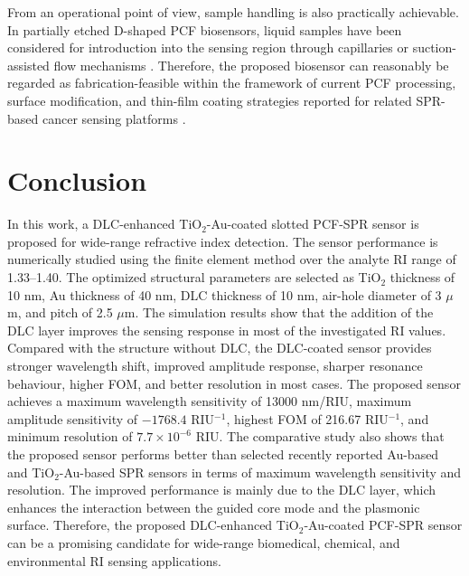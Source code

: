 \documentclass[preprint,12pt]{elsarticle}
\begin{document}
From an operational point of view, sample handling is also practically achievable. In partially etched D-shaped PCF biosensors, liquid samples have been considered for introduction into the sensing region through capillaries or suction-assisted flow mechanisms \cite{singh2023bottom}. Therefore, the proposed biosensor can reasonably be regarded as fabrication-feasible within the framework of current PCF processing, surface modification, and thin-film coating strategies reported for related SPR-based cancer sensing platforms \cite{ashrafian2025highly,bhuyan2025black,singh2023bottom,erdogan2025diamond,rafi2025cancer}.

\section{\textbf{{Conclusion}}}

In this work, a DLC-enhanced TiO$_2$-Au-coated slotted PCF-SPR sensor is proposed for wide-range refractive index detection. The sensor performance is numerically studied using the finite element method over the analyte RI range of 1.33--1.40. The optimized structural parameters are selected as TiO$_2$ thickness of 10 nm, Au thickness of 40 nm, DLC thickness of 10 nm, air-hole diameter of 3 $\mu$m, and pitch of 2.5 $\mu$m. The simulation results show that the addition of the DLC layer improves the sensing response in most of the investigated RI values. Compared with the structure without DLC, the DLC-coated sensor provides stronger wavelength shift, improved amplitude response, sharper resonance behaviour, higher FOM, and better resolution in most cases. The proposed sensor achieves a maximum wavelength sensitivity of 13000 nm/RIU, maximum amplitude sensitivity of $-1768.4$ RIU$^{-1}$, highest FOM of 216.67 RIU$^{-1}$, and minimum resolution of $7.7\times10^{-6}$ RIU. The comparative study also shows that the proposed sensor performs better than selected recently reported Au-based and TiO$_2$-Au-based SPR sensors in terms of maximum wavelength sensitivity and resolution. The improved performance is mainly due to the DLC layer, which enhances the interaction between the guided core mode and the plasmonic surface. Therefore, the proposed DLC-enhanced TiO$_2$-Au-coated PCF-SPR sensor can be a promising candidate for wide-range biomedical, chemical, and environmental RI sensing applications.










\end{document}
